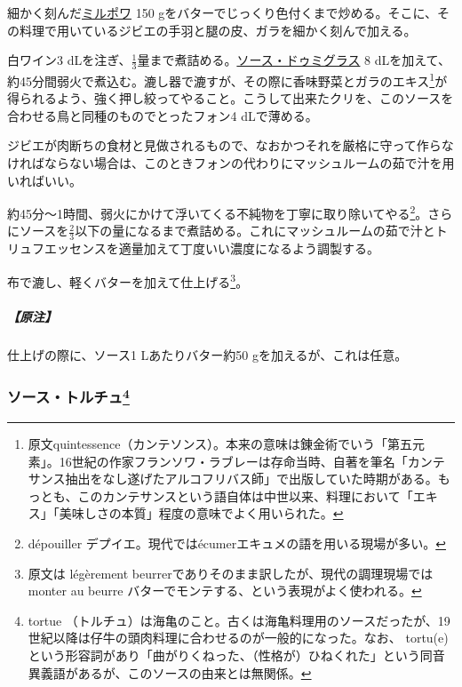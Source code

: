 \begin{recette}
細かく刻んだ\protect\hyperlink{mirepoix}{ミルポワ} 150
gをバターでじっくり色付くまで炒める。そこに、その料理で用いているジビエの手羽と腿の皮、ガラを細かく刻んで加える。

白ワイン3
dLを注ぎ、\(\frac{1}{3}\)量まで煮詰める。\protect\hyperlink{sauce-demi-glace}{ソース・ドゥミグラス}
8
dLを加えて、約45分間弱火で煮込む。漉し器で漉すが、その際に香味野菜とガラのエキス\footnote{原文quintessence（カンテソンス）。本来の意味は錬金術でいう「第五元素」。16世紀の作家フランソワ・ラブレーは存命当時、自著を筆名「カンテサンス抽出をなし遂げたアルコフリバス師」で出版していた時期がある。もっとも、このカンテサンスという語自体は中世以来、料理において「エキス」「美味しさの本質」程度の意味でよく用いられた。}が得られるよう、強く押し絞ってやること。こうして出来たクリを、このソースを合わせる鳥と同種のものでとったフォン4
dLで薄める。

ジビエが肉断ちの食材と見做されるもので、なおかつそれを厳格に守って作らなければならない場合は、このときフォンの代わりにマッシュルームの茹で汁を用いればいい。

約45分〜1時間、弱火にかけて浮いてくる不純物を丁寧に取り除いてやる\footnote{dépouiller
  デプイエ。現代ではécumerエキュメの語を用いる現場が多い。}。さらにソースを\(\frac{2}{3}\)以下の量になるまで煮詰める。これにマッシュルームの茹で汁とトリュフエッセンスを適量加えて丁度いい濃度になるよう調製する。

布で漉し、軽くバターを加えて仕上げる\footnote{原文は légèrement
  beurrerでありそのまま訳したが、現代の調理現場ではmonter au beurre
  バターでモンテする、という表現がよく使われる。}。

\hypertarget{nota-sauce-salmis}{%
\subparagraph{【原注】}\label{nota-sauce-salmis}}

仕上げの際に、ソース1 Lあたりバター約50 gを加えるが、これは任意。

\atoaki{}

\hypertarget{sauce-tortue}{%
\subsubsection[ソース・トルチュ]{\texorpdfstring{ソース・トルチュ\footnote{tortue
  （トルチュ）は海亀のこと。古くは海亀料理用のソースだったが、19世紀以降は仔牛の頭肉料理に合わせるのが一般的になった。なお、
  tortu(e)という形容詞があり「曲がりくねった、（性格が）ひねくれた」という同音異義語があるが、このソースの由来とは無関係。}}{ソース・トルチュ}}\label{sauce-tortue}}



\end{recette}
